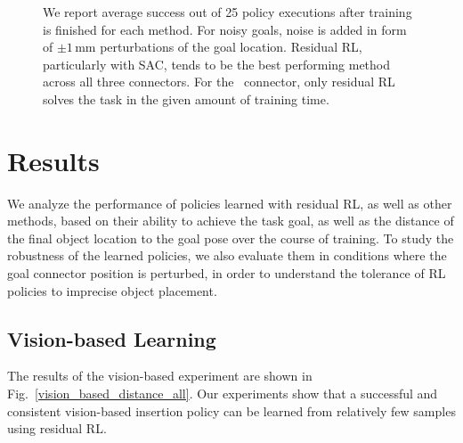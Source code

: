 \begin{figure}[btp]
\begin{tabular}{|l|l|l|l|}
        \end{tabular}
    \caption{We report average success out of 25 policy executions after training is finished for each method. For noisy goals, noise is added in form of $\pm 1\,\mathrm{mm}$ perturbations of the goal location. Residual RL, particularly with SAC, tends to be the best performing method across all three connectors. For the ~connector, only residual RL solves the task in the given amount of training time.}
    \label{fig:tables}
\end{figure}

\section{Results}\label{sec:results}

We analyze the performance of policies learned with residual RL, as well as other methods, based on their ability to achieve the task goal, as well as the distance of the final object location to the goal pose over the course of training. To study the robustness of the learned policies, we also evaluate them in conditions where the goal connector position is perturbed, in order to understand the tolerance of RL policies to imprecise object placement.

\subsection{Vision-based Learning}
The results of the vision-based experiment are shown in Fig.~\ref{vision_based_distance_all}.
Our experiments show that a successful and consistent vision-based insertion policy can be learned from relatively few samples using residual RL. 

